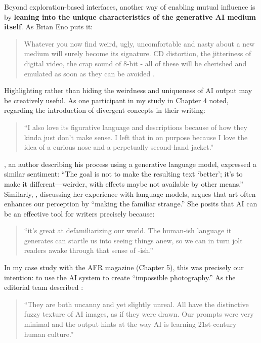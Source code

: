 Beyond exploration-based interfaces, another way of enabling mutual influence is by \textbf{leaning into the unique characteristics of the generative AI medium itself}. As Brian Eno puts it:

\begin{quote}
Whatever you now find weird, ugly, uncomfortable and nasty about a new medium will surely become its signature. CD distortion, the jitteriness of digital video, the crap sound of 8-bit - all of these will be cherished and emulated as soon as they can be avoided \citep{Eno2007-fl}.
\end{quote}

Highlighting rather than hiding the weirdness and uniqueness of AI output may be creatively useful. As one participant in my study in Chapter 4 noted, regarding the introduction of divergent concepts in their writing:

\begin{quote}
``I also love its figurative language and descriptions because of how they kinda just don't make sense. I left that in on purpose because I love the idea of a curious nose and a perpetually second-hand jacket.''
\end{quote}

\citet{Sloan2016-fj}, an author describing his process using a generative language model, expressed a similar sentiment: ``The goal is not to make the resulting text `better'; it's to make it different—weirder, with effects maybe not available by other means.'' Similarly, \citet{Samuel2019-gc}, discussing her experience with language models, argues that art often enhances our perception by ``making the familiar strange.'' She posits that AI can be an effective tool for writers precisely because:

\begin{quote}
``it's great at defamiliarizing our world. The human-ish language it generates can startle us into seeing things anew, so we can in turn jolt readers awake through that sense of -ish.''
\end{quote}

In my case study with the AFR magazine (Chapter 5), this was precisely our intention: to use the AI system to create ``impossible photography.'' As the editorial team described \citep{Drummond2023-av}:

\begin{quote}
``They are both uncanny and yet slightly unreal. All have the distinctive fuzzy texture of AI images, as if they were drawn. Our prompts were very minimal and the output hints at the way AI is learning 21st-century human culture.''
\end{quote}

